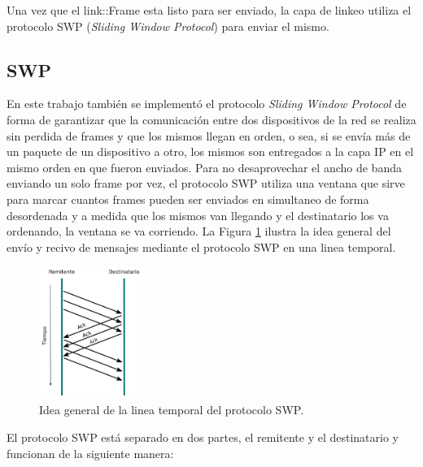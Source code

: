 \documentclass[10pt,a4paper]{article}
\begin{document}
Una vez que el link::Frame esta listo para ser enviado, la capa de linkeo utiliza el protocolo SWP (\textit{Sliding Window Protocol}) para enviar el mismo. \\

\subsection{SWP}

En este trabajo también se implementó el protocolo \textit{Sliding Window Protocol} de forma de garantizar que la comunicación entre dos dispositivos de la red se realiza sin perdida de frames y que los mismos llegan en orden, o sea, si se envía más de un paquete de un dispositivo a otro, los mismos son entregados a la capa IP en el mismo orden en que fueron enviados. Para no desaprovechar el ancho de banda enviando un solo frame por vez, el protocolo SWP utiliza una ventana que sirve para marcar cuantos frames pueden ser enviados en simultaneo de forma desordenada y a medida que los mismos van llegando y el destinatario los va ordenando, la ventana se va corriendo. La Figura \ref{figure: swp timeline} ilustra la idea general del envío y recivo de mensajes mediante el protocolo SWP en una linea temporal.\\

\begin{figure}[!htb]
    \centering
    \includegraphics[width = 0.3\textwidth]{img/png/swp-timeline.png}
    \caption{Idea general de la linea temporal del protocolo SWP.}
    \label{figure: swp timeline}
\end{figure}

El protocolo SWP está separado en dos partes, el remitente y el destinatario y funcionan de la siguiente manera:
\end{document}
